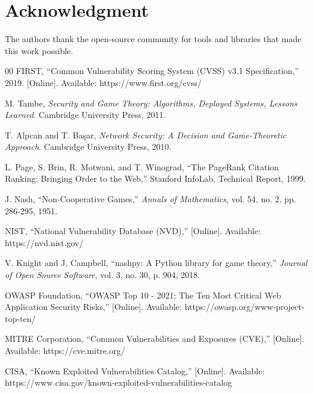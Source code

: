 \documentclass[conference]{IEEEtran}
\begin{document}
\section*{Acknowledgment}
The authors thank the open-source community for tools and libraries that made this work possible.

\begin{thebibliography}{00}
 FIRST, ``Common Vulnerability Scoring System (CVSS) v3.1 Specification,'' 2019. [Online]. Available: https://www.first.org/cvss/

 M. Tambe, \textit{Security and Game Theory: Algorithms, Deployed Systems, Lessons Learned}. Cambridge University Press, 2011.

 T. Alpcan and T. Başar, \textit{Network Security: A Decision and Game-Theoretic Approach}. Cambridge University Press, 2010.

 L. Page, S. Brin, R. Motwani, and T. Winograd, ``The PageRank Citation Ranking: Bringing Order to the Web,'' Stanford InfoLab, Technical Report, 1999.

 J. Nash, ``Non-Cooperative Games,'' \textit{Annals of Mathematics}, vol. 54, no. 2, pp. 286-295, 1951.

 NIST, ``National Vulnerability Database (NVD),'' [Online]. Available: https://nvd.nist.gov/

 V. Knight and J. Campbell, ``nashpy: A Python library for game theory,'' \textit{Journal of Open Source Software}, vol. 3, no. 30, p. 904, 2018.

 OWASP Foundation, ``OWASP Top 10 - 2021: The Ten Most Critical Web Application Security Risks,'' [Online]. Available: https://owasp.org/www-project-top-ten/

 MITRE Corporation, ``Common Vulnerabilities and Exposures (CVE),'' [Online]. Available: https://cve.mitre.org/

 CISA, ``Known Exploited Vulnerabilities Catalog,'' [Online]. Available: https://www.cisa.gov/known-exploited-vulnerabilities-catalog

\end{thebibliography}
\end{document}
